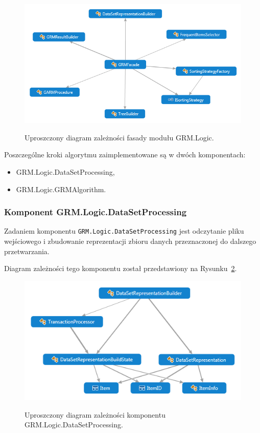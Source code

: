 \documentclass[a4paper,10pt]{article}
\begin{document}
 \begin{figure}[!ht]
  \begin{center}
   \scalebox{0.7}
   {
    \includegraphics{../diagrams/GRMFacade_dependency_diagram.png}
   }
  \end{center}
  \caption{
   Uproszczony diagram zależności fasady modułu GRM.Logic.
  }
  \label{fig:diag:log:Facade}
 \end{figure}
 
 Poszczególne kroki algorytmu zaimplementowane są w dwóch komponentach:
 
 \begin{itemize}
  \item GRM.Logic.DataSetProcessing,
  \item GRM.Logic.GRMAlgorithm.
 \end{itemize}

 
  \subsubsection{Komponent GRM.Logic.DataSetProcessing}
  Zadaniem komponentu \verb+GRM.Logic.DataSetProcessing+ jest odczytanie pliku wejściowego i zbudowanie reprezentacji zbioru danych przeznaczonej do dalszego przetwarzania.
  
  Diagram zależności tego komponentu został przedstawiony na Rysunku~\ref{fig:diag:log:DataSetProcessing}.
  
  \begin{figure}[!ht]
   \begin{center}
    \scalebox{0.7}
    {
     \includegraphics{../diagrams/DataSetProcessing_dependency_diagram.png}
    }
   \end{center}
   \caption{
    Uproszczony diagram zależności komponentu GRM.Logic.DataSetProcessing.
   }
   \label{fig:diag:log:DataSetProcessing}
  \end{figure}
 
\end{document}
